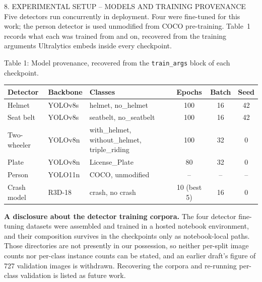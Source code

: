 \documentclass[aspectratio=169,10pt,t]{beamer}
\begin{document}
\begin{frame}{8. EXPERIMENTAL SETUP -- MODELS AND TRAINING PROVENANCE}
\scriptsize
Five detectors run concurrently in deployment. Four were fine-tuned for this work; the person detector is used
unmodified from COCO pre-training. Table~1 records what each was trained from and on, recovered from the training
arguments Ultralytics embeds inside every checkpoint.
\vspace{0.5em}

\centering
{\tiny Table 1: Model provenance, recovered from the \texttt{train\_args} block of each checkpoint.}\\[0.2em]
\begin{tabular}{@{}llp{42mm}ccc@{}}
\toprule
\textbf{Detector} & \textbf{Backbone} & \textbf{Classes} & \textbf{Epochs} & \textbf{Batch} & \textbf{Seed}\\
\midrule
Helmet & YOLOv8s & helmet, no\_helmet & 100 & 16 & 42\\
Seat belt & YOLOv8s & seatbelt, no\_seatbelt & 100 & 16 & 42\\
Two-wheeler & YOLOv8n & with\_helmet, without\_helmet, triple\_riding & 100 & 32 & 0\\
Plate & YOLOv8n & License\_Plate & 80 & 32 & 0\\
Person & YOLO11n & COCO, unmodified & -- & -- & --\\
Crash model & R3D-18 & crash, no crash & 10 (best 5) & 16 & 0\\
\bottomrule
\end{tabular}
\vspace{0.6em}

\raggedright
\textbf{A disclosure about the detector training corpora.} The four detector fine-tuning datasets were assembled and
trained in a hosted notebook environment, and their composition survives in the checkpoints only as notebook-local
paths. Those directories are not presently in our possession, so neither per-split image counts nor per-class
instance counts can be stated, and an earlier draft's figure of 727 validation images is withdrawn. Recovering the
corpora and re-running per-class validation is listed as future work.
\end{frame}
\end{document}
